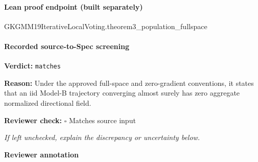 \documentclass[10pt]{article}
\newcommand{\reviewerbox}{%
  \par\noindent\fbox{\parbox{0.96\linewidth}{\rule{0pt}{0.38in}}}\par
}
\newcommand{\reviewmatch}[1]{%
  \par\noindent\textbf{Reviewer check:} $\square$\; #1\par
  \noindent\emph{If left unchecked, explain the discrepancy or uncertainty below.}\par
}
\begin{document}
\paragraph{Lean proof endpoint (built separately)}\begin{ReviewVerbatim}
GKGMM19IterativeLocalVoting.theorem3_population_fullspace
\end{ReviewVerbatim}

\paragraph{Recorded source-to-Spec screening}
\textbf{Verdict:} \texttt{matches}
\\
{\raggedright
\textbf{Reason:} Under the approved full-\allowbreak{}space and zero-\allowbreak{}gradient conventions, it states that an iid Model-\allowbreak{}B trajectory converging almost surely has zero aggregate normalized directional field.\allowbreak{}
\par}
\reviewmatch{Matches source input}
\noindent\textbf{Reviewer annotation}\par
\reviewerbox
\end{document}
